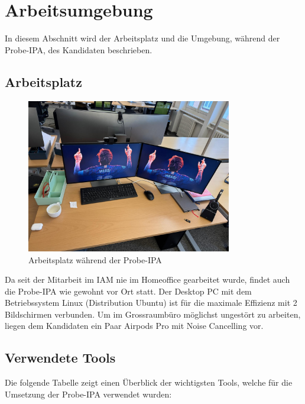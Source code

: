 \chapter{Arbeitsumgebung}\label{ch:arbeitsumgebung}
In diesem Abschnitt wird der Arbeitsplatz und die Umgebung, während der Probe-IPA, des Kandidaten beschrieben.
\section{Arbeitsplatz}\label{sec:arbeitsplatz}

\begin{figure}[H]
    \begin{center}
        \includegraphics[width=0.8\textwidth]{ressourcen/arbeitsplatz}
        \caption[Arbeitsplatz]{Arbeitsplatz während der Probe-IPA}\label{fig:arbeitsplatz}
    \end{center}
\end{figure}

Da seit der Mitarbeit im IAM nie im Homeoffice gearbeitet wurde, findet auch die Probe-IPA wie gewohnt vor Ort statt. Der Desktop PC mit dem Betriebssystem Linux (Distribution Ubuntu) ist für die maximale Effizienz mit 2 Bildschirmen verbunden. Um im Grossraumbüro möglichst ungestört zu arbeiten, liegen dem Kandidaten ein Paar Airpods Pro mit Noise Cancelling vor.

\newpage \section{Verwendete Tools}\label{sec:verwendete-tools}
Die folgende Tabelle zeigt einen Überblick der wichtigsten Tools, welche für die Umsetzung der Probe-IPA verwendet wurden:

